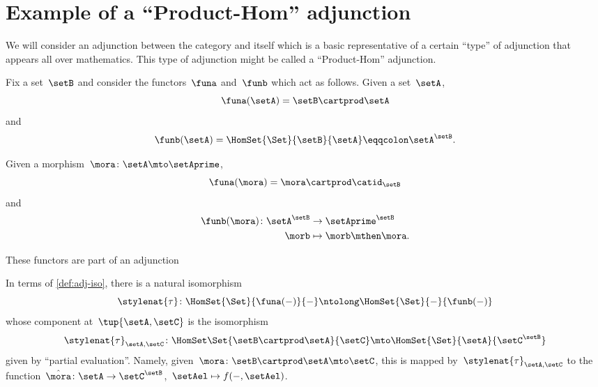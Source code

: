 

\section{Example of a ``Product-Hom'' adjunction}
We will consider an adjunction between the category \Set and itself which is a basic representative of a certain ``type'' of adjunction that appears all over mathematics.
This type of adjunction might be called a ``Product-Hom'' adjunction.

Fix a set~$\setB$ and consider the functors~$\funa$ and~$\funb$ which act as follows.
Given a set~$\setA$,
\begin{equation*}
    \funa(\setA) = \setB \cartprod \setA
\end{equation*}
and
\begin{equation*}
    \funb(\setA) = \HomSet{\Set}{\setB}{\setA} \eqqcolon \setA^\setB.
\end{equation*}

Given a morphism~$\mora\colon \setA \mto \setAprime$,
\begin{equation*}
    \funa(\mora) = \mora \cartprod \catid_\setB
\end{equation*}
and
\begin{equation*}
    \begin{aligned}
        \funb(\mora)\colon \setA^\setB &\to \setAprime^\setB\\
        \morb &\mapsto \morb \mthen \mora.
    \end{aligned}
\end{equation*}

These functors are part of an adjunction

\begin{center}
\end{center}
In terms of \cref{def:adj-iso}, there is a natural isomorphism
\begin{equation*}
    \stylenat{\tau}\colon \HomSet{\Set}{\funa(- )}{-}  \ntolong   \HomSet{\Set}{-}{\funb( - )}
\end{equation*}
whose component at~$\tup{\setA,\setC}$ is the isomorphism
\begin{equation*}
    \stylenat{\tau}_{\setA,\setC} \colon \HomSet\Set{\setB\cartprod \setA}{\setC} \mto \HomSet{\Set}{\setA}{\setC^\setB}
\end{equation*}
given by ``partial evaluation''.
Namely, given~$\mora \colon \setB \cartprod \setA \mto \setC$, this is mapped by~$\stylenat{\tau}_{\setA,\setC}$ to the function~$\hat \mora \colon \setA \to \setC^\setB$,~$\setAel \mapsto f( -, \setAel)$.

